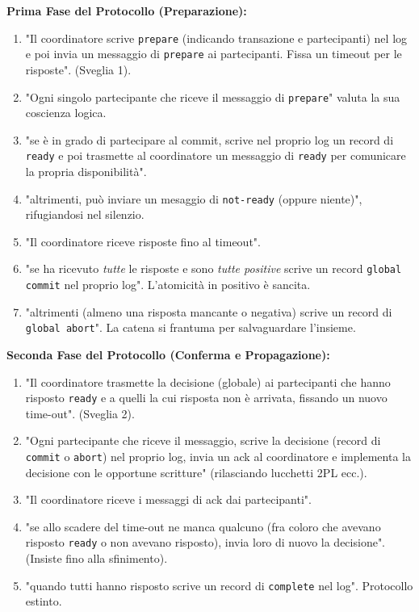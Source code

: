 \textbf{Prima Fase del Protocollo (Preparazione):}
\begin{enumerate}
    \item "Il coordinatore scrive \texttt{prepare} (indicando transazione e partecipanti) nel log e poi invia un messaggio di \texttt{prepare} ai partecipanti. Fissa un timeout per le risposte". (Sveglia 1).
    \item "Ogni singolo partecipante che riceve il messaggio di \texttt{prepare}" valuta la sua coscienza logica.
    \item "se è in grado di partecipare al commit, scrive nel proprio log un record di \texttt{ready} e poi trasmette al coordinatore un messaggio di \texttt{ready} per comunicare la propria disponibilità".
    \item "altrimenti, può inviare un mesaggio di \texttt{not-ready} (oppure niente)", rifugiandosi nel silenzio.
    \item "Il coordinatore riceve risposte fino al timeout".
    \item "se ha ricevuto \textit{tutte} le risposte e sono \textit{tutte positive} scrive un record \texttt{global commit} nel proprio log". L'atomicità in positivo è sancita.
    \item "altrimenti (almeno una risposta mancante o negativa) scrive un record di \texttt{global abort}". La catena si frantuma per salvaguardare l'insieme.
\end{enumerate}

\textbf{Seconda Fase del Protocollo (Conferma e Propagazione):}
\begin{enumerate}
    \item "Il coordinatore trasmette la decisione (globale) ai partecipanti che hanno risposto \texttt{ready} e a quelli la cui risposta non è arrivata, fissando un nuovo time-out". (Sveglia 2).
    \item "Ogni partecipante che riceve il messaggio, scrive la decisione (record di \texttt{commit} o \texttt{abort}) nel proprio log, invia un ack al coordinatore e implementa la decisione con le opportune scritture" (rilasciando lucchetti 2PL ecc.).
    \item "Il coordinatore riceve i messaggi di ack dai partecipanti".
    \item "se allo scadere del time-out ne manca qualcuno (fra coloro che avevano risposto \texttt{ready} o non avevano risposto), invia loro di nuovo la decisione". (Insiste fino alla sfinimento).
    \item "quando tutti hanno risposto scrive un record di \texttt{complete} nel log". Protocollo estinto.
\end{enumerate}

